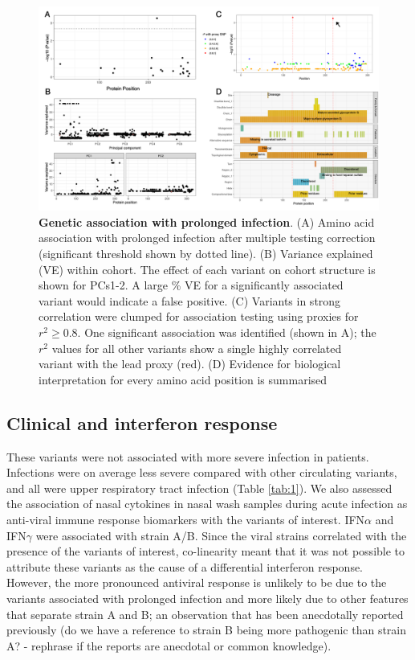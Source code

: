 \documentclass{article} %
\begin{document}
\begin{figure}[ht] \hspace{-0.5cm} 
    \includegraphics[scale=0.85]{f3}
	\caption{\textbf{Genetic association with prolonged infection}. (A) Amino acid association with prolonged infection after multiple testing correction (significant threshold shown by dotted line). (B) Variance explained (VE) within cohort. The effect of each variant on cohort structure is shown for PCs1-2. A large \% VE for a significantly associated variant would indicate a false positive. (C) Variants in strong correlation were clumped for association testing using proxies for $r^2 \ge 0.8$. One significant association was identified (shown in A); the $r^2$ values for all other variants show a single highly correlated variant with the lead proxy (red). 
	(D) Evidence for biological interpretation for every amino acid position is summarised}
	\label{fig:3}
\end{figure}
\clearpage

\subsection{Clinical and interferon response}
These variants were not associated with more severe infection in patients. 
Infections were on average less severe compared with other circulating variants, and all were upper respiratory tract infection (Table \ref{tab:1}). 
We also assessed the association of nasal cytokines in nasal wash samples during acute infection as anti-viral immune response biomarkers with the variants of interest.
IFN$\alpha$ and IFN$\gamma$ were associated with strain A/B.
Since the viral strains correlated with the presence of the variants of interest, co-linearity meant that it was not possible to attribute these variants as the cause of a differential interferon response.
However, the more pronounced antiviral response is unlikely to be due to the variants associated with prolonged infection and more likely due to other features that separate strain A and B; an observation that has been anecdotally reported previously 
(do we have a reference to strain B being more pathogenic than strain A? - rephrase if the reports are anecdotal or common knowledge). 
\end{document}
